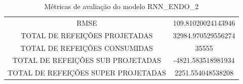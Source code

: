         {\begin{center} \begin{minipage}[c]{0.45\textwidth}
                \begin{figure}[H]
                \end{figure}\end{minipage} \hfill %
                      \begin{minipage}[c]{1.0\textwidth}
                \begin{figure}[H]
                \end{figure}
                 \end{minipage} \end{center} }
                
                   \begin{table}[!ht]
                   \centering
                   \caption{Métricas de avaliação do modelo RNN\_ENDO\_2 }
                    \begin{tabular}{|c|c|}
                    \rowcolor{gray!50}
                    \hline
                \multicolumn{2}{c}{METRICAS DO MODELO RNN\_ENDO\_2 :}  \\ \hline
                RMSE & 109.81020024143946\\
                TOTAL DE REFEIÇÕES PROJETADAS & 32984.970529556274\\
                TOTAL DE REFEIÇÕES CONSUMIDAS & 35555\\
                TOTAL DE REFEIÇÕES SUB PROJETADAS & -4821.583518981934\\
                TOTAL DE REFEIÇÕES SUPER PROJETADAS & 2251.554048538208\\
                \hline \end{tabular} \end{table}
                
